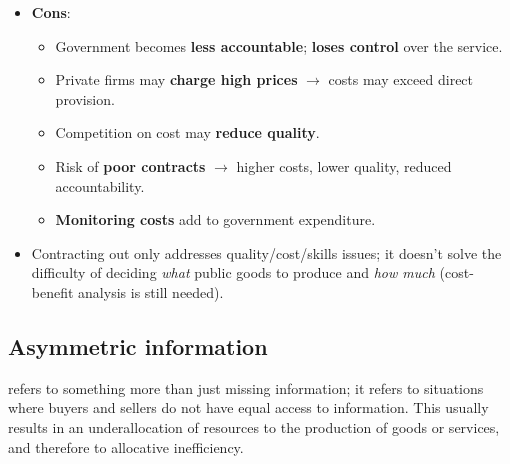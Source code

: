 \begin{itemize}
\begin{itemize}
\begin{itemize}
    \end{itemize}
    \item \textbf{Cons}:
    \begin{itemize}
      \item Government becomes \textbf{less accountable}; \textbf{loses control} over the service.
      \item Private firms may \textbf{charge high prices} $\to$ costs may exceed direct provision.
      \item Competition on cost may \textbf{reduce quality}.
      \item Risk of \textbf{poor contracts} $\to$ higher costs, lower quality, reduced accountability.
      \item \textbf{Monitoring costs} add to government expenditure.
    \end{itemize}
    \item Contracting out only addresses quality/cost/skills issues; it doesn't solve the difficulty of deciding \textit{what} public goods to produce and \textit{how much} (cost-benefit analysis is still needed).
  \end{itemize}
\end{itemize}
\subsection{Asymmetric information}
 refers to something more than just missing information; it refers to situations where buyers and sellers do not have equal access to information.
This usually results in an underallocation of resources to the production of goods or services, and therefore to allocative inefficiency.
